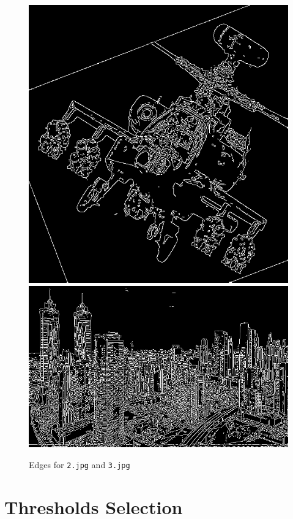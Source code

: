 \documentclass{ee208report}
\begin{document}
\begin{multicols*}{2}
\begin{figure}[H]
    \centering
    \includegraphics[width=\linewidth]{images/2_final.png}
    \includegraphics[width=\linewidth]{images/3_final.png}
    \caption{Edges for \texttt{2.jpg} and \texttt{3.jpg}}
    \label{fig:other-edges}
\end{figure}

\section{Thresholds Selection}


\end{multicols*}
\end{document}
